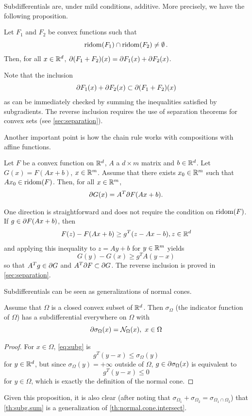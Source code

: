 Subdifferentials are, under mild conditions, additive. More precisely, we have the following proposition.
\begin{theorem}
\label{th:subg.sum}
Let $F_1$ and $F_2$ be convex functions such that 
\[
\mathrm{ridom}(F_1) \cap \mathrm{ridom}(F_2)\neq \emptyset\,.
\]
Then,
for all $x\in {\mathbb{R}}^d$,  $\partial (F_1+F_2)(x) = \partial F_1(x) + \partial F_2(x)$.
\end{theorem}
Note that the inclusion
\[
\partial F_1(x) + \partial F_2(x) \subset \partial (F_1+F_2)(x)
\]
as can be immediately checked by summing the inequalities satisfied by subgradients. The reverse inclusion requires the use of separation theorems for convex sets (see \cref{sec:separation}).

Another important point is how the chain rule works with compositions with affine functions.
\begin{theorem}
\label{th:subg.affine}
Let $F$ be a convex function on ${\mathbb{R}}^d$, $A$ a $d\times m$ matrix and $b\in{\mathbb{R}}^d$. Let $G(x) = F(Ax+b)$, $x\in {\mathbb{R}}^m$. Assume that there exists $x_0\in {\mathbb{R}}^m$ such that  $Ax_0\in \mathrm{ridom}(F)$. Then, for all $x\in {\mathbb{R}}^m$, 
\[
\partial G(x) = A^T\partial F(Ax+b).
\]
\end{theorem}
One direction is straightforward and does not require the condition on $\mathrm{ridom}(F)$. If $g \in \partial F(Ax+b)$, then
\[
F(z) - F(Ax+b) \geq g^T (z - Ax -b), z\in {\mathbb{R}}^d
\]
and applying this inequality to $z = Ay+b$ for $y\in {\mathbb{R}}^m$ yields
\[
G(y) - G(x) \geq g^T A (y-x)
\]
so that $A^Tg\in \partial G$ and   $A^T \partial F \subset \partial G$. The reverse inclusion is proved in \cref{sec:separation}.


Subdifferentials can be seen as generalizations of normal cones. 

\begin{proposition}
\label{prop:subg.cone}
Assume that $\Omega$ is a closed convex subset of ${\mathbb{R}}^d$. Then $\sigma_\Omega$ (the indicator function of $\Omega$) has a subdifferential  everywhere on $\Omega$ with 
\[
\partial \sigma_\Omega (x) = {\mathcal N}_\Omega(x),\ x\in \Omega
\]
\end{proposition}
\begin{proof}
For $x\in \Omega$, \cref{eq:subg} is
\[
g^T(y-x) \leq \sigma_\Omega(y)
\]
for $y\in {\mathbb{R}}^d$, but since $\sigma_\Omega(y) = +\infty$ outside of $\Omega$, $g\in \partial \sigma_\Omega(x)$ is equivalent to 
\[
g^T(y-x) \leq 0
\]
for $y\in \Omega$, which is exactly the definition of the normal cone.
\end{proof}
Given this proposition, it is also clear (after noting that $\sigma_{\Omega_1} + \sigma_{\Omega_2} = \sigma_{\Omega_1\cap\Omega_2}$) that \cref{th:subg.sum} is a generalization of \cref{th:normal.cone.intersect}. 

